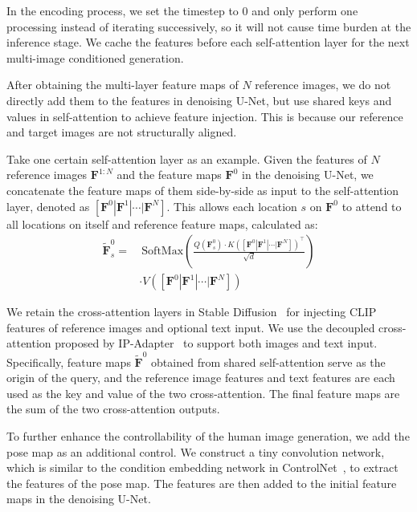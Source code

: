 In the encoding process, we set the timestep to 0 and only perform one processing instead of iterating successively, so it will not cause time burden at the inference stage. We cache the features before each self-attention layer for the next multi-image conditioned generation.

 After obtaining the multi-layer feature maps of $N$ reference images, we do not directly add them to the features in denoising U-Net, but use shared keys and values in self-attention to achieve feature injection. This is because our reference and target images are not structurally aligned.

Take one certain self-attention layer as an example. Given the features of $N$ reference images $\bm{F}^{1:N}$ and the feature maps $\bm{F}^{0}$ in the denoising U-Net, we concatenate the feature maps of them side-by-side as input to the self-attention layer, denoted as $[\bm{F}^{0}|\bm{F}^{1}|\cdots|\bm{F}^{N}]$. This allows each location $s$ on $\bm{F}^{0}$ to attend to all locations on itself and reference feature maps, calculated as:
\begin{equation}
\begin{split}
    \tilde{\bm{F}}_{s}^{0} =&\ \text{SoftMax}\left(
    \frac{
    Q(\bm{F}_s^0)\cdot K([\bm{F}^{0}|\bm{F}^{1}|\cdots|\bm{F}^{N}])^{\top}
    }{
    \sqrt{d}
    }\right)  \\
    & \cdot V([\bm{F}^{0}|\bm{F}^{1}|\cdots|\bm{F}^{N}])
    \label{eq:vanilla_self_attn}
\end{split}
\end{equation}

We retain the cross-attention layers in Stable Diffusion~\cite{rombach2022ldm} for injecting CLIP features of reference images and optional text input. We use the decoupled cross-attention proposed by IP-Adapter~\cite{ye2023ipadapter} to support both images and text input. Specifically, feature maps $\tilde{\bm{F}}^{0}$ obtained from shared self-attention serve as the origin of the query, and the reference image features and text features are each used as the key and value of the two cross-attention. The final feature maps are the sum of the two cross-attention outputs.

To further enhance the controllability of the human image generation, we add the pose map as an additional control. We construct a tiny convolution network, which is similar to the condition embedding network in ControlNet~\cite{zhang2023controlnet}, to extract the features of the pose map. The features are then added to the initial feature maps in the denoising U-Net.

